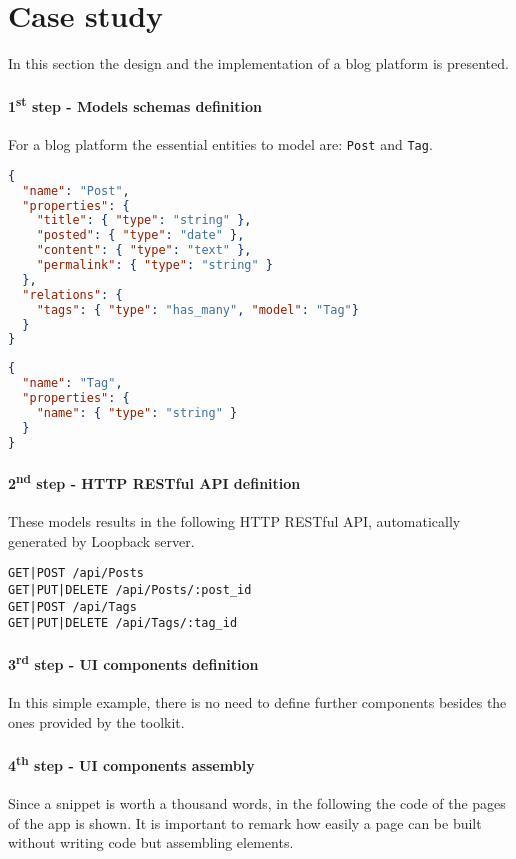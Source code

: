 \section{Case study}\label{sec:case-study}
In this section the design and the implementation of a blog platform is presented. 

\paragraph{1\textsuperscript{st} step - Models schemas definition}
For a blog platform the essential entities to model are: \texttt{Post} and \texttt{Tag}.

\begin{lstlisting}[language=json]
{
  "name": "Post",
  "properties": {
    "title": { "type": "string" },
    "posted": { "type": "date" },
    "content": { "type": "text" },
    "permalink": { "type": "string" }
  }, 
  "relations": {
    "tags": { "type": "has_many", "model": "Tag"}
  }
}
\end{lstlisting}

\begin{lstlisting}[language=json]
{
  "name": "Tag",
  "properties": {
    "name": { "type": "string" }
  }
}
\end{lstlisting}

\paragraph{2\textsuperscript{nd} step - HTTP RESTful API definition}
These models results in the following HTTP RESTful API, automatically generated by Loopback server.

\begin{lstlisting}
GET|POST /api/Posts
GET|PUT|DELETE /api/Posts/:post_id
GET|POST /api/Tags
GET|PUT|DELETE /api/Tags/:tag_id
\end{lstlisting} 

\paragraph{3\textsuperscript{rd} step - UI components definition}
In this simple example, there is no need to define further components besides the ones provided by the  toolkit.

\paragraph{4\textsuperscript{th} step - UI components assembly}
Since a snippet is worth a thousand words, in the following the code of the pages of the app is shown.
It is important to remark how easily a page can be built without writing code but assembling elements.

